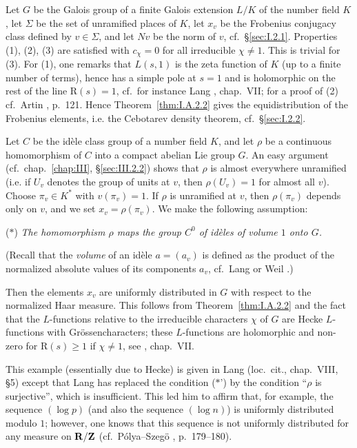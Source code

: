\begin{remarks}
\begin{nlist}
\item Let $G$ be the Galois group of a finite Galois extension $L/K$ of the number field $K$, let $\Sigma$ be the set of unramified places of $K$, let $x_v$ be the Frobenius conjugacy class defined by $v \in \Sigma$, and let $Nv$ be the norm of $v$, cf.~\S\ref{sec:I.2.1}. Properties (1), (2), (3) are satisfied with $c_\chi = 0$ for all irreducible $\chi \neq 1$. This is trivial for (3). For (1), one remarks that $L(s,1)$ is the zeta function of $K$ (up to a finite number of terms), hence has a simple pole at $s = 1$ and is holomorphic on the rest of the line $\mathrm{R}(s) = 1$, cf.~for instance Lang \cite{lang-algnum}, chap.~VII; for a proof of (2) cf.~Artin \cite{artin-collected}, p.~121. Hence Theorem~\ref{thm:I.A.2.2} gives the equidistribution of the Frobenius elements, i.e. the Cebotarev density theorem, cf.~\S\ref{sec:I.2.2}.

\item Let $C$ be the id\`ele class group of a number field $K$, and let $\rho$ be a continuous homomorphism of $C$ into a compact abelian Lie group $G$. An easy argument (cf.~chap.~\ref{chap:III}, \S\ref{sec:III.2.2}) shows that $\rho$ is almost everywhere unramified (i.e. if $U_v$ denotes the group of units at $v$, then $\rho(U_v) = 1$ for almost all $v$). Choose $\pi_v \in K^*$ with $v(\pi_v) = 1$. If $\rho$ is unramified at $v$, then $\rho(\pi_v)$ depends only on $v$, and we set $x_v = \rho(\pi_v)$. We make the following assumption:

($*$) \emph{The homomorphism $\rho$ maps the group $C^0$ of id\`eles of volume $1$ onto $G$.}

(Recall that the \emph{volume} of an id\`ele $a = (a_v)$ is defined as the product of the normalized absolute values of its components $a_v$, cf.~Lang \cite{lang-algnum} or Weil \cite{weil-bnt}.)

Then the elements $x_v$ are uniformly distributed in $G$ with respect to the normalized Haar measure. This follows from Theorem~\ref{thm:I.A.2.2} and the fact that the $L$-functions relative to the irreducible characters $\chi$ of $G$ are Hecke $L$-functions with Gr\"ossencharacters; these $L$-functions are holomorphic and non-zero for $\mathrm{R}(s) \geq 1$ if $\chi \neq 1$, see \cite{lang-algnum}, chap.~VII.
\end{nlist}
\end{remarks}

\begin{remarks}
This example (essentially due to Hecke) is given in Lang (loc.~cit., chap.~VIII, \S 5) except that Lang has replaced the condition ($*$') by the condition ``$\rho$ is surjective'', which is insufficient. This led him to affirm that, for example, the sequence $(\log p)$ (and also the sequence $(\log n)$) is uniformly distributed modulo $1$; however, one knows that this sequence is not uniformly distributed for any measure on $\mathbf{R}/\mathbf{Z}$ (cf.~P\'olya--Szeg\"o \cite{polya-szego}, p.~179--180).
\end{remarks}

